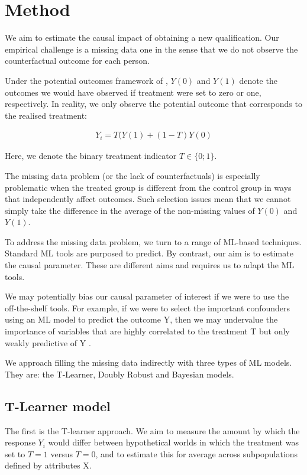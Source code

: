 \documentclass[12pt, a4paper]{article}
\begin{document}
\section{Method}

We aim to estimate the causal impact of obtaining a new qualification. Our empirical challenge is a missing data one in the sense that we do not observe the counterfactual outcome for each person.

Under the potential outcomes framework of \cite{imbens2015}, $Y(0)$ and $Y(1)$ denote the outcomes we would have observed if treatment were set to zero or one, respectively. In reality, we only observe the potential outcome that corresponds to the realised treatment:

\begin{align}
Y_i=T(Y(1) + (1-T) Y(0)
\end{align}


Here, we denote the binary treatment indicator $T \in \{0;1\}$.

The missing data problem (or the lack of counterfactuals) is especially problematic when the treated group is different from the control group in ways that independently affect outcomes. Such selection issues mean that we cannot simply take the difference in the average of the non-missing values of $Y(0)$ and $Y(1)$.

To address the missing data problem, we turn to a range of ML-based techniques. Standard ML tools are purposed to predict. By contrast, our aim is to estimate the causal parameter. These are different aims and requires us to adapt the ML tools. 

We may potentially bias our causal parameter of interest if we were to use the off-the-shelf tools. For example, if we were to select the important confounders using an ML model to predict the outcome Y, then we may undervalue the importance of variables that are highly correlated to the treatment T but only weakly predictive of Y \citep{cherno2018}.

We approach filling the missing data indirectly with three types of ML models. They are: the T-Learner, Doubly Robust and Bayesian models. 


\subsection{T-Learner model}

The first is the T-learner approach. We aim to measure the amount by which the response $Y_i$ would differ between hypothetical worlds in which the treatment was set to $T=1$ versus $T=0$, and to estimate this for average across subpopulations defined by attributes X.
\end{document}
